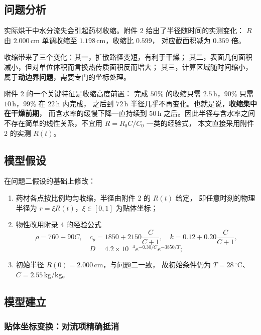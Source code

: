 \documentclass[12pt,a4paper,fontset=none]{ctexart}
\begin{document}
\subsection{问题分析}

实际烘干中水分流失会引起药材收缩。附件 2 给出了半径随时间的实测变化：
$R$ 由 $2.000$\,cm 单调收缩至 $1.198$\,cm，收缩比 $0.599$，
对应截面积减为 $0.359$ 倍。

收缩带来了三个变化：其一，扩散路径变短，有利于干燥；
其二，表面几何面积减小，但对单位体积而言换热传质面积反而增大；
其三，计算区域随时间缩小，属于\textbf{动边界问题}，需要专门的坐标处理。

附件 2 的一个关键特征是收缩高度前置：
完成 $50\%$ 的收缩只需 $2.5$\,h，$90\%$ 只需 $10$\,h，$99\%$ 在 $22$\,h 内完成，
之后到 $72$\,h 半径几乎不再变化。也就是说，\textbf{收缩集中在干燥前期}，
而含水率的缓慢下降一直持续到 $50$\,h 之后。因此半径与含水率之间
不存在简单的线性关系，不宜用 $R=R_0 C/C_0$ 一类的经验式，
本文直接采用附件 2 的实测 $R(t)$。

\subsection{模型假设}

在问题二假设的基础上修改：

\begin{enumerate}
  \item[(C1)] 药材各点按比例均匀收缩，半径由附件 2 的 $R(t)$ 给定，
        即任意时刻的物理半径为 $r=\xi R(t)$，$\xi\in[0,1]$ 为贴体坐标；
  \item[(C2)] 物性改用附录 4 的经验公式
        \begin{equation}
          \rho=760+90C,\quad
          c_p=1850+2150\frac{C}{C+1},\quad
          k=0.12+0.20\frac{C}{C+1},
          \label{eq:p4-props}
        \end{equation}
        \begin{equation}
          D=4.2\times10^{-4}e^{-0.30/C}e^{-3850/T};
          \label{eq:p4-D}
        \end{equation}
  \item[(C3)] 初始半径 $R(0)=2.000$\,cm，与问题二一致，
        故初始条件仍为 $T=28\,^\circ$C、$C=2.55$\,kg/kg。
\end{enumerate}

\subsection{模型建立}

\subsubsection{贴体坐标变换：对流项精确抵消}
\end{document}

